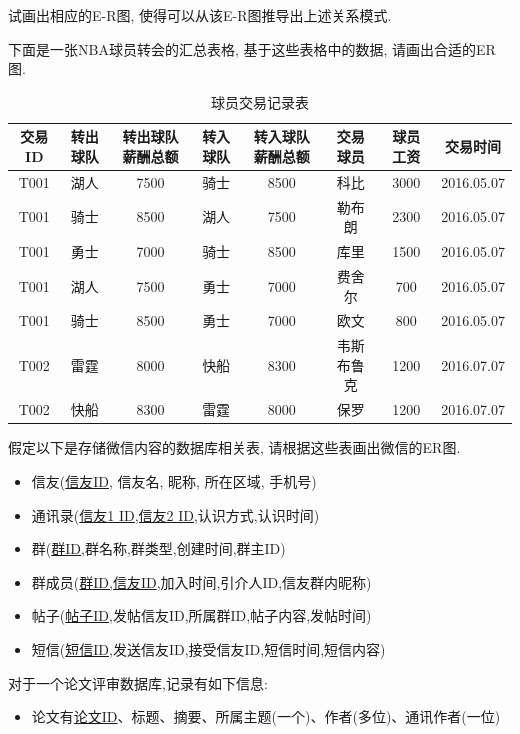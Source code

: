 \begin{problemset}
  试画出相应的E-R图, 使得可以从该E-R图推导出上述关系模式.
  \item 下面是一张NBA球员转会的汇总表格, 基于这些表格中的数据, 请画出合适的ER图.
  \begin{table}[H]
\centering
\begin{tabular}{|c|c|c|c|c|c|c|c|}
\hline
交易ID & 转出球队 & 转出球队薪酬总额 & 转入球队 & 转入球队薪酬总额 & 交易球员 & 球员工资 & 交易时间 \\
\hline
T001 & 湖人 & 7500 & 骑士 & 8500 & 科比 & 3000 & 2016.05.07 \\
\hline
T001 & 骑士 & 8500 & 湖人 & 7500 & 勒布朗 & 2300 & 2016.05.07 \\
\hline
T001 & 勇士 & 7000 & 骑士 & 8500 & 库里 & 1500 & 2016.05.07 \\
\hline
T001 & 湖人 & 7500 & 勇士 & 7000 & 费舍尔 & 700 & 2016.05.07 \\
\hline
T001 & 骑士 & 8500 & 勇士 & 7000 & 欧文 & 800 & 2016.05.07 \\
\hline
T002 & 雷霆 & 8000 & 快船 & 8300 & 韦斯布鲁克 & 1200 & 2016.07.07 \\
\hline
T002 & 快船 & 8300 & 雷霆 & 8000 & 保罗 & 1200 & 2016.07.07 \\
\hline
\end{tabular}
\caption{球员交易记录表}
\label{tab:player_transactions}
\end{table}
    \item 假定以下是存储微信内容的数据库相关表, 请根据这些表画出微信的ER图.
    \begin{itemize}
    \item 信友({\underline{信友ID}}, 信友名, 昵称, 所在区域, 手机号)
    \item 通讯录({\underline{信友1 ID,信友2 ID}},认识方式,认识时间)
    \item 群({\underline{群ID}},群名称,群类型,创建时间,群主ID)
    \item 群成员({\underline{群ID,信友ID}},加入时间,引介人ID,信友群内昵称)
    \item 帖子({\underline{帖子ID}},发帖信友ID,所属群ID,帖子内容,发帖时间)
    \item 短信({\underline{短信ID}},发送信友ID,接受信友ID,短信时间,短信内容)
  \end{itemize}
  \item 对于一个论文评审数据库,记录有如下信息: 
  \begin{itemize}
    \item 论文有{\underline{论文ID}}、标题、摘要、所属主题(一个)、作者(多位)、通讯作者(一位)

\end{itemize}
\end{problemset}

